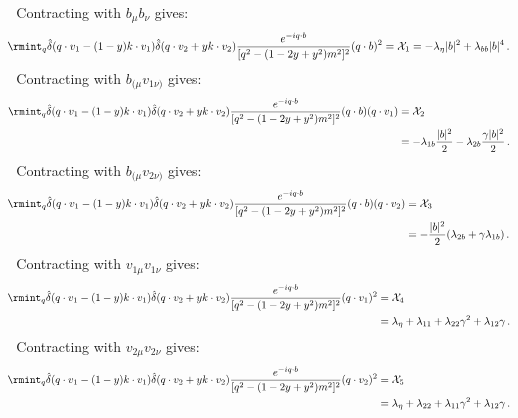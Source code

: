     \textbullet $\,\,$ Contracting with $b_\mu b_\nu$ gives:
    \begin{align}
       \rmint_q \hat\delta(q\cdot v_1-(1-y)k\cdot v_1)\hat\delta(q\cdot v_2+yk\cdot v_2)\frac{e^{-i q\cdot b}}{[q^2-(1-2y+y^2)m^2]^2} (q\cdot b)^2=\mathcal{X}_1=-\lambda_{\eta}|b|^2+\lambda_{bb}|b|^4\,.\label{A.24 m}
    \end{align}
    \textbullet $\,\,$ Contracting with $b_{(\mu}v_{1\nu)}$ gives:
    \begin{align}
    \begin{split}
        \rmint_q \hat\delta(q\cdot v_1-(1-y)k\cdot v_1)\hat\delta(q\cdot v_2+yk\cdot v_2)\frac{e^{-i q\cdot b}}{[q^2-(1-2y+y^2)m^2]^2} (q\cdot b)(q\cdot v_1)&=\mathcal{X}_2\\ &\hspace{0cm}=-\lambda_{1b}\frac{|b|^2}{2}-\lambda_{2b}\frac{\gamma |b|^2}{2}\,.
        \end{split}
    \end{align}
    \textbullet $\,\,$ Contracting with $b_{(\mu}v_{2\nu)}$ gives:
    \begin{align}
        \begin{split}
        \rmint_q \hat\delta(q\cdot v_1-(1-y)k\cdot v_1)\hat\delta(q\cdot v_2+yk\cdot v_2)\frac{e^{-i q\cdot b}}{[q^2-(1-2y+y^2)m^2]^2} (q\cdot b)(q\cdot v_2)&=\mathcal{X}_3\\ &=-\frac{|b|^2}{2}(\lambda_{2b}+\gamma \lambda_{1b})\,.
        \end{split}
    \end{align}
     \textbullet $\,\,$ Contracting with $v_{1\mu} v_{1\nu}$ gives:
    \begin{align}
        \begin{split}
             \rmint_q \hat\delta(q\cdot v_1-(1-y)k\cdot v_1)\hat\delta(q\cdot v_2+yk\cdot v_2)\frac{e^{-i q\cdot b}}{[q^2-(1-2y+y^2)m^2]^2}(q\cdot v_1)^2&=\mathcal{X}_4\\ &
           \hspace{0cm}  =\lambda_{\eta}+\lambda_{11}+\lambda_{22}\gamma^2+\lambda_{12}\gamma\,.
        \end{split}
    \end{align}
   \textbullet $\,\,$ Contracting with $v_{2\mu} v_{2\nu}$ gives:
    \begin{align}
        \begin{split}
              \rmint_q \hat\delta(q\cdot v_1-(1-y)k\cdot v_1)\hat\delta(q\cdot v_2+yk\cdot v_2)\frac{e^{-i q\cdot b}}{[q^2-(1-2y+y^2)m^2]^2}(q\cdot v_2)^2&=\mathcal{X}_5\\ &
              \hspace{0cm}=\lambda_\eta+\lambda_{22}+\lambda_{11} \gamma^2+\lambda_{12}\gamma\,.
        \end{split}
    \end{align}
